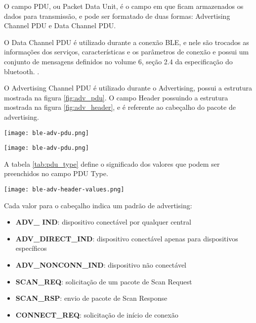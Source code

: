 O campo PDU, ou Packet Data Unit, é o campo em que ficam armazenados os dados
para transmissão, e pode ser formatado de duas formas: Advertising Channel PDU e
Data Channel PDU.

O Data Channel PDU é utilizado durante a conexão BLE, e nele são trocados as
informações dos serviços, características e os parâmetros de conexão e possui um
conjunto de mensagens definidos no volume 6, seção 2.4 da especificação do
bluetooth. \cite{ble4core}.

O Advertising Channel PDU é utilizado durante o Advertising, possui a estrutura
mostrada na figura \ref{fig:adv_pdu}. O campo Header possuindo a estrutura
mostrada na figura \ref{fig:adv_header}, e é referente ao cabeçalho do pacote
de advertising.

\begin{center}
	\centering 
	\texttt{[image: ble-adv-pdu.png]}  
	\label{fig:adv_pdu}
\end{center}  

\begin{center}
	\centering 
	\texttt{[image: ble-adv-pdu.png]}  
	\label{fig:adv_header}
\end{center}  

A tabela \ref{tab:pdu_type} define o significado dos valores que podem ser
preenchidos no campo PDU Type.

\begin{center}
	\centering 
	\texttt{[image: ble-adv-header-values.png]}  
	\label{tab:pdu_type}
\end{center}  

Cada valor para o cabeçalho indica um padrão de advertising:

\begin{itemize}[noitemsep]
  \item \textbf{ADV\_ IND}: dispositivo conectável por qualquer central
  \item \textbf{ADV\_DIRECT\_IND}: dispositivo conectável apenas para
  dispositivos específicos
  \item \textbf{ADV\_NONCONN\_IND}: dispositivo não conectável
  \item \textbf{SCAN\_REQ}: solicitação de um pacote de Scan Request
  \item \textbf{SCAN\_RSP}: envio de pacote de Scan Response
  \item \textbf{CONNECT\_REQ}: solicitação de início de conexão
\end{itemize} 


